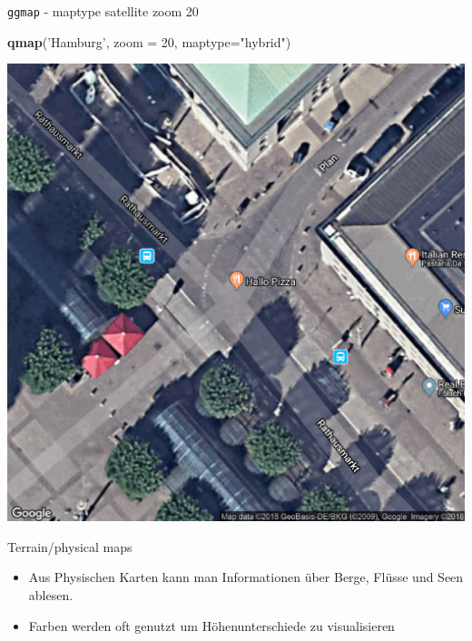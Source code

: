 \documentclass[ignorenonframetext,]{beamer}
\newenvironment{Shaded}{\begin{snugshade}}{\end{snugshade}}
\newcommand{\KeywordTok}[1]{\textcolor[rgb]{0.13,0.29,0.53}{\textbf{#1}}}
\newcommand{\DataTypeTok}[1]{\textcolor[rgb]{0.13,0.29,0.53}{#1}}
\newcommand{\DecValTok}[1]{\textcolor[rgb]{0.00,0.00,0.81}{#1}}
\newcommand{\StringTok}[1]{\textcolor[rgb]{0.31,0.60,0.02}{#1}}
\newcommand{\NormalTok}[1]{#1}
\begin{document}
\begin{frame}[fragile]{\texttt{ggmap} - maptype satellite zoom 20}

\begin{Shaded}
\begin{Highlighting}[]
\KeywordTok{qmap}\NormalTok{(}\StringTok{'Hamburg'}\NormalTok{, }\DataTypeTok{zoom =} \DecValTok{20}\NormalTok{, }\DataTypeTok{maptype=}\StringTok{"hybrid"}\NormalTok{)}
\end{Highlighting}
\end{Shaded}

\includegraphics{figure/ham_map.pdf}

\end{frame}

\begin{frame}{Terrain/physical maps}

\begin{itemize}
\item
  Aus Physischen Karten kann man Informationen über Berge, Flüsse und
  Seen ablesen.
\item
  Farben werden oft genutzt um Höhenunterschiede zu visualisieren
\end{itemize}

\end{frame}
\end{document}
